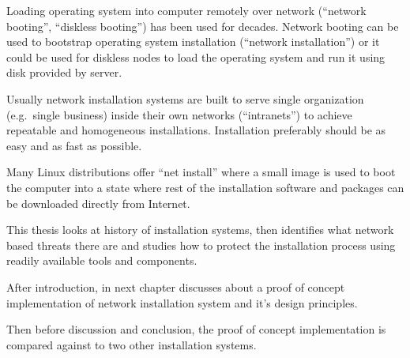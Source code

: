 
\iffalse
FIXME: TODO REMOVE THIS LIST
\begin{itemize}
\item INTRODUCTION: The Setting - bird eye's view - the challenge to be tackled / thing to be be improved in general
\item INTRODUCTION: Past research done
\item INTRODUCTION: Gap in knowledge/problem not yet solved
\item INTRODUCTION: Purpose and method of this work
\item INTRODUCTION: More detailed description what was done
\item INTRODUCTION: Results acquired
\item INTRODUCTION: Analysis and limitations of the result (Mostly relocate to Conclusions)
\item INTRODUCTION: Value (Mostly relocate to Conclusions)
\end{itemize}
\fi

Loading operating system into computer remotely over network
(``network booting'', ``diskless booting'') has been used for
decades. Network booting can be used to bootstrap operating system
installation (``network installation'') or it could be used for
diskless nodes to load the operating system and run it using disk
provided by server.

Usually network installation systems are built to serve single
organization (e.g.\ single business) inside their own networks
(``intranets'') to achieve repeatable and homogeneous
installations. Installation preferably should be as easy and as fast
as possible.

Many Linux distributions offer ``net install'' where a small image is
used to boot the computer into a state where rest of the installation
software and packages can be downloaded directly from Internet.

This thesis looks at history of installation systems, then identifies
what network based threats there are and studies how to protect the
installation process using readily available tools and components.

After introduction, in next chapter discusses about a proof of concept
implementation of network installation system and it's design
principles.

Then before discussion and conclusion, the proof of concept
implementation is compared against to two other installation systems.

